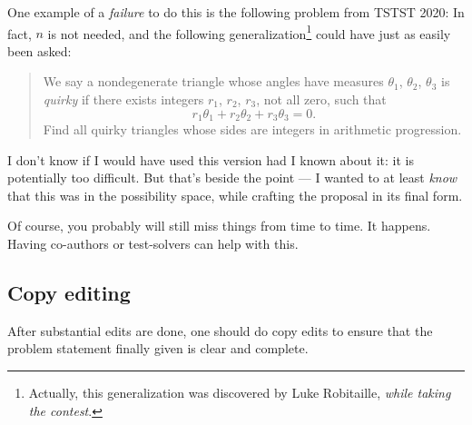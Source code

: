 \documentclass[11pt]{scrartcl}
\theoremstyle{inlined}
\begin{document}
One example of a \emph{failure} to do this is the following problem from TSTST 2020:
In fact, $n$ is not needed, and the following generalization\footnote{Actually,
   this generalization was discovered by Luke Robitaille, \emph{while taking the contest}.}
could have just as easily been asked:
\begin{quote}
   We say a nondegenerate triangle whose angles have
   measures $\theta_1$, $\theta_2$, $\theta_3$ is \emph{quirky}
   if there exists integers $r_1$, $r_2$, $r_3$, not all zero,
   such that \[ r_1 \theta_1 + r_2 \theta_2 + r_3 \theta_3 = 0. \]
   Find all quirky triangles whose sides are integers
   in arithmetic progression.
\end{quote}

I don't know if I would have used this version had I known about it:
it is potentially too difficult.
But that's beside the point --- I wanted to at least
\emph{know} that this was in the possibility space,
while crafting the proposal in its final form.

Of course, you probably will still miss things from time to time. It happens.
Having co-authors or test-solvers can help with this.

\subsection{Copy editing}
After substantial edits are done,
one should do copy edits to ensure that the problem statement
finally given is clear and complete.
\end{document}
